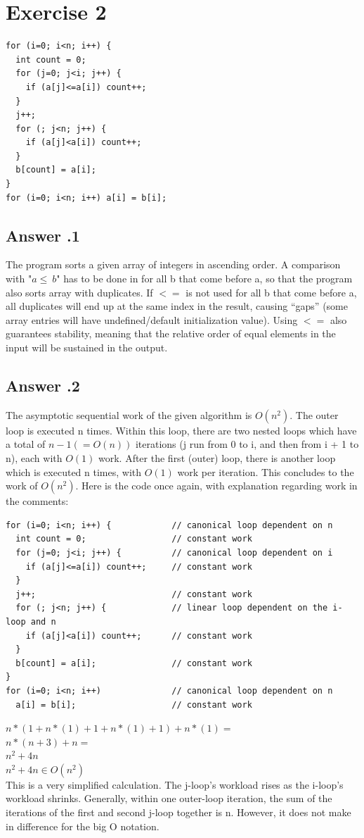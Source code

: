 \documentclass[a4paper,%
11pt,%
DIV=12,
headsepline,%
headings=normal,
]{scrartcl}
\newcounter{curex}
\newcommand{\exercise}[1]{\section*{Exercise #1}\setcounter{curex}{#1}}
\newcommand{\answer}[1]{\subsection*{Answer \arabic{curex}.#1}}
\begin{document}
\exercise{2}

\begin{lstlisting}
for (i=0; i<n; i++) {
  int count = 0;
  for (j=0; j<i; j++) {
    if (a[j]<=a[i]) count++;
  }
  j++;
  for (; j<n; j++) {
    if (a[j]<a[i]) count++;
  }
  b[count] = a[i];
}
for (i=0; i<n; i++) a[i] = b[i];
\end{lstlisting}

\answer{1}
The program sorts a given array of integers in ascending order. A comparison with "$a \leq \ b$" has to be done in for all b that come before a, so that the program also sorts array with duplicates. If $<=$ is not used for all b that come before a, all duplicates will end up at the same index in the result, causing ``gaps'' (some array entries will have undefined/default initialization value). Using $<=$ also guarantees stability, meaning that the relative order of equal elements in the input will be sustained in the output.

\answer{2}
The asymptotic sequential work of the given algorithm is $O(n^{2})$. The outer loop is executed n times. Within this loop, there are two nested loops which have a total of $n-1 (= O(n))$ iterations (j run from 0 to i, and then from i + 1 to n), each with $O(1)$ work. After the first (outer) loop, there is another loop which is executed n times, with $O(1)$ work per iteration. This concludes to the work of $O(n^{2})$. Here is the code once again, with explanation regarding work in the comments:

\begin{lstlisting}
for (i=0; i<n; i++) {            // canonical loop dependent on n
  int count = 0;                 // constant work
  for (j=0; j<i; j++) {          // canonical loop dependent on i
    if (a[j]<=a[i]) count++;     // constant work
  }
  j++;                           // constant work
  for (; j<n; j++) {             // linear loop dependent on the i-loop and n
    if (a[j]<a[i]) count++;      // constant work
  }
  b[count] = a[i];               // constant work
}
for (i=0; i<n; i++)              // canonical loop dependent on n
  a[i] = b[i];                   // constant work
\end{lstlisting}

\begin{math}n*(1 + n*(1) + 1 + n*(1) + 1) + n*(1) =\end{math}\\
\begin{math}n*(n + 3) + n =\end{math}\\
\begin{math}n^2 + 4n\end{math}\\
\begin{math}n^2 + 4n \in O(n^2)\end{math}\\
This is a very simplified calculation. The j-loop's workload rises as the i-loop's workload shrinks. Generally, within one outer-loop iteration, the sum of the iterations of the first and second j-loop together is n. However, it does not make in difference for the big O notation.
\end{document}
